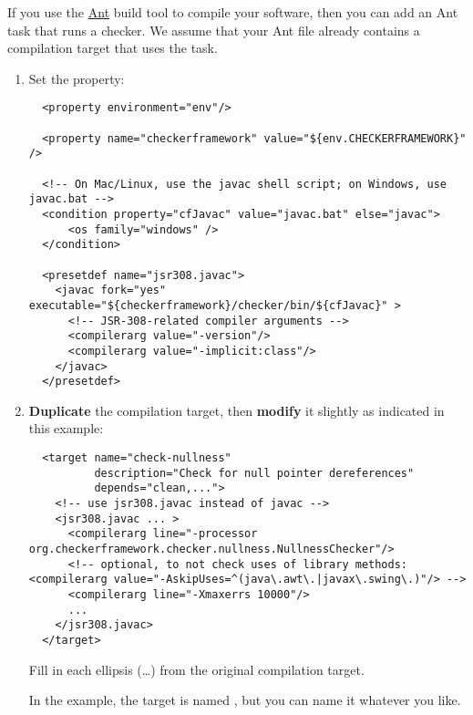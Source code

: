 If you use the \href{http://ant.apache.org/}{Ant} build tool to compile
your software, then you can add an Ant task that runs a checker.  We assume
that your Ant file already contains a compilation target that uses the
 task.

\begin{enumerate}
\item
Set the  property:

\begin{smaller}
\begin{Verbatim}
  <property environment="env"/>

  <property name="checkerframework" value="${env.CHECKERFRAMEWORK}" />
  
  <!-- On Mac/Linux, use the javac shell script; on Windows, use javac.bat -->
  <condition property="cfJavac" value="javac.bat" else="javac">
      <os family="windows" />
  </condition>

  <presetdef name="jsr308.javac">
    <javac fork="yes" executable="${checkerframework}/checker/bin/${cfJavac}" >
      <!-- JSR-308-related compiler arguments -->
      <compilerarg value="-version"/>
      <compilerarg value="-implicit:class"/>
    </javac>
  </presetdef>
\end{Verbatim}
\end{smaller}

\item \textbf{Duplicate} the compilation target, then \textbf{modify} it slightly as
indicated in this example:

\begin{smaller}
\begin{Verbatim}
  <target name="check-nullness"
          description="Check for null pointer dereferences"
          depends="clean,...">
    <!-- use jsr308.javac instead of javac -->
    <jsr308.javac ... >
      <compilerarg line="-processor org.checkerframework.checker.nullness.NullnessChecker"/>
      <!-- optional, to not check uses of library methods: <compilerarg value="-AskipUses=^(java\.awt\.|javax\.swing\.)"/> -->
      <compilerarg line="-Xmaxerrs 10000"/>
      ...
    </jsr308.javac>
  </target>
\end{Verbatim}
\end{smaller}

Fill in each ellipsis (\ldots) from the original compilation target.

In the example, the target is named , but you can
name it whatever you like.
\end{enumerate}


